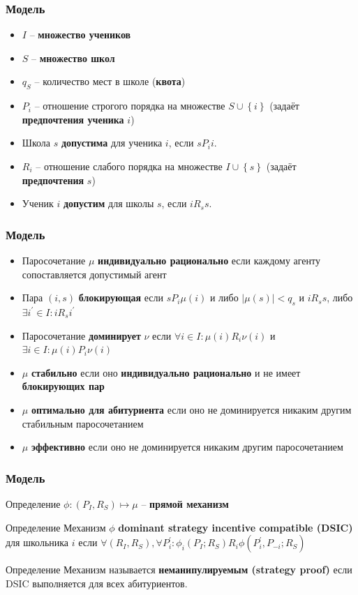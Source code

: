 \documentclass[10pt,pdf,hyperref={unicode}]{beamer}
\begin{document}
\begin{frame}
    \frametitle{Модель}
    \begin{itemize}
        \item $I$ -- {\bf множество учеников}
        \item $S$ -- {\bf множество школ}
        \item $q_S$ -- количество мест в школе ({\bf квота})
        \item $P_i$ -- отношение строгого порядка на множестве $S \cup \left\{i\right\}$ (задаёт {\bf предпочтения ученика} $i$)
        \item Школа $s$ {\bf допустима} для ученика $i$, если $s P_i i$.
        \item $R_i$ -- отношение слабого порядка на множестве $I \cup \left\{s\right\}$ (задаёт {\bf предпочтения} $s$)
        \item Ученик $i$ {\bf допустим} для школы $s$, если $i R_s s$.
    \end{itemize}
\end{frame}

\begin{frame}
    \frametitle{Модель}
    \begin{itemize}
        \item Паросочетание $\mu$ {\bf индивидуально рационально} если каждому агенту сопоставляется допустимый агент
        \item Пара $(i, s)$ {\bf блокирующая} если $s P_i \mu(i)$ и либо $|\mu(s)| < q_s$ и $i R_s s$, либо  $\exists i^\prime \in I: i R_s i^\prime$
        \item Паросочетание {\bf доминирует} $\nu$ если $\forall i \in I: \mu(i) R_i \nu(i)$ и $\exists i \in I: \mu(i) P_i \nu(i)$
        \item $\mu$ {\bf стабильно} если оно {\bf индивидуально рационально} и не имеет {\bf блокирующих пар}
        \item $\mu$ {\bf оптимально для абитуриента} если оно не доминируется никаким другим стабильным паросочетанием
        \item $\mu$ {\bf эффективно} если оно не доминируется никаким другим паросочетанием
    \end{itemize}
\end{frame}

\begin{frame}
    \frametitle{Модель}
    \begin{block}{Определение}
        $\phi: (P_I, R_S) \longmapsto \mu$ -- {\bf прямой механизм} 
    \end{block}

    \begin{block}{Определение}
        Механизм $\phi$ {\bf dominant strategy incentive compatible (DSIC)} для школьника $i$ если $\forall (R_I, R_S), \forall P_i^\prime: \phi_i(P_I; R_S) R_i \phi(P_i^\prime, P_{-i}; R_S)$
    \end{block}

    \begin{block}{Определение}
        Механизм называется {\bf неманипулируемым (strategy proof)} если DSIC выполняется для всех абитуриентов.
    \end{block}
\end{frame}
\end{document}
